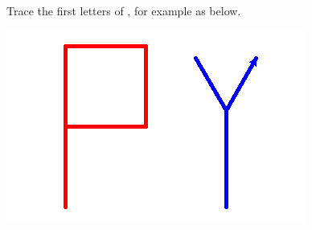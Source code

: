 \documentclass[11pt,class=report,crop=false]{standalone}
\begin{document}
\begin{activite}


Trace the first letters of \Python{}, for example as below.

\begin{center}
\includegraphics[scale=\myscale,scale=0.4]{screen-turtle-1}
\end{center}

\end{activite}




\end{document}

